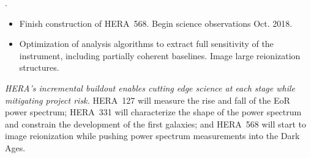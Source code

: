 \documentclass[preprint]{aastex}
\begin{document}
\vspace{-7pt}
.
\begin{itemize}\setlength{\parskip}{0pt}\itemsep0pt
\vspace{-7pt}
  \item Finish construction of HERA~568. Begin science observations Oct. 2018.
  \item Optimization of analysis algorithms to extract full sensitivity of the instrument, 
including partially coherent baselines.  Image large reionization structures.
\end{itemize}

\vspace{-8pt}
\noindent
\emph{HERA's incremental buildout enables cutting edge science at each stage while mitigating project risk.}
HERA~127 will measure the rise and fall of the EoR power spectrum; HERA~331
will characterize the shape of the power spectrum and constrain the development
of the first galaxies; and HERA~568 will start to image reionization while
pushing power spectrum measurements into the Dark Ages.
\end{document}
